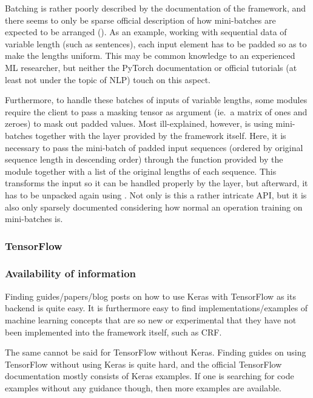 Batching is rather poorly described by the documentation of the framework, and
there seems to only be sparse official description of how mini-batches are
expected to be arranged (\cite{falcon2018lstms}).  As an example, working with
sequential data of variable length (such as sentences), each input element has
to be padded so as to make the lengths uniform. This may be common knowledge to an
experienced ML researcher, but neither the PyTorch documentation or official
tutorials (at least not under the topic of NLP) touch on this aspect.

Furthermore, to handle these batches of inputs of variable lengths, some modules
require the client to pass a masking tensor as argument (ie.\ a matrix of ones
and zeroes) to mask out padded values. Most ill-explained, however, is using
mini-batches together with the  layer provided by the framework
itself. Here, it is necessary to pass the mini-batch of padded input sequences
(ordered by original sequence length in descending order) through the
 function provided by the 
module together with a list of the original lengths of each sequence. This
transforms the input so it can be handled properly by the  layer, but
afterward, it has to be unpacked again using . Not
only is this a rather intricate API, but it is also only sparsely documented
considering how normal an operation training on mini-batches is.


\subsubsection{TensorFlow}\label{sec:discuss_tensorflow}

\subsubsection*{Availability of information}

Finding guides/papers/blog posts on how to use Keras with TensorFlow as its
backend is quite easy. It is furthermore easy to find implementations/examples
of machine learning concepts that are so new or experimental that they have not
been implemented into the framework itself, such as CRF\@.

The same cannot be said for TensorFlow without Keras. Finding guides on using
TensorFlow without using Keras is quite hard, and the official TensorFlow
documentation mostly consists of Keras examples. If one is searching for code
examples without any guidance though, then more examples are available.

